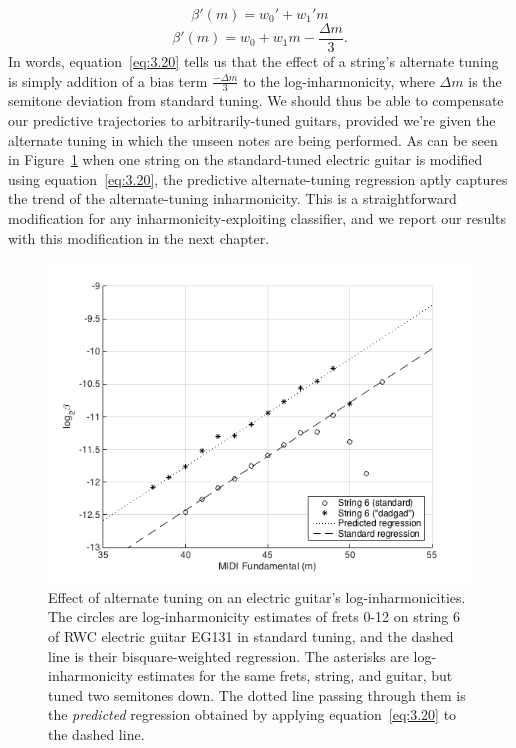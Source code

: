 \documentclass[12pt]{cmuthesis}
\begin{document}
\begin{equation}
\label{eq:3.19}
\beta'(m) = w_0' + w_1'm
\end{equation}
\begin{equation}
\label{eq:3.20}
\beta'(m) = w_0 + w_1m - \frac{\Delta m}{3}.
\end{equation}
In words, equation~\eqref{eq:3.20} tells us that the effect of a string's alternate tuning is simply addition of a bias term $\frac{-\Delta m}{3}$ to the log-inharmonicity, where $\Delta m$ is the semitone deviation from standard tuning. We should thus be able to compensate our predictive trajectories to arbitrarily-tuned guitars, provided we're given the alternate tuning in which the unseen notes are being performed. As can be seen in Figure~\ref{fig:tuning-eg} when one string on the standard-tuned electric guitar is modified using equation~\eqref{eq:3.20}, the predictive alternate-tuning regression aptly captures the trend of the alternate-tuning inharmonicity. This is a straightforward modification for any inharmonicity-exploiting classifier, and we report our results with this modification in the next chapter.
\begin{figure}[!htbp] 
\label{fig:tuning-eg}
\centering
\includegraphics[scale=0.75]{tuning-eg}
\caption{Effect of alternate tuning on an electric guitar's log-inharmonicities. The circles are log-inharmonicity estimates of frets 0-12 on string 6 of RWC electric guitar EG131 in standard tuning, and the dashed line is their bisquare-weighted regression. The asterisks are log-inharmonicity estimates for the same frets, string, and guitar, but tuned two semitones down. The dotted line passing through them is the \textit{predicted} regression obtained by applying equation~\eqref{eq:3.20} to the dashed line.}
\end{figure}
\end{document}
